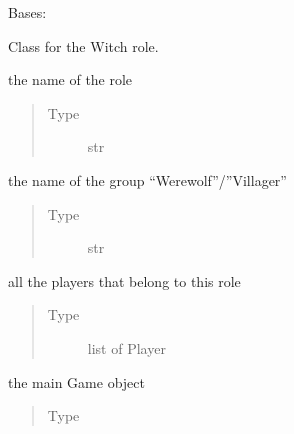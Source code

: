 \documentclass[letterpaper,10pt,english]{sphinxmanual}
\begin{document}
\begin{fulllineitems}
Bases: 

Class for the Witch role.


\begin{fulllineitems}
the name of the role
\begin{quote}\begin{description}
\item[{Type}] \leavevmode
str

\end{description}\end{quote}

\end{fulllineitems}



\begin{fulllineitems}
the name of the group “Werewolf”/”Villager”
\begin{quote}\begin{description}
\item[{Type}] \leavevmode
str

\end{description}\end{quote}

\end{fulllineitems}



\begin{fulllineitems}
all the players that belong to this role
\begin{quote}\begin{description}
\item[{Type}] \leavevmode
list of Player

\end{description}\end{quote}

\end{fulllineitems}



\begin{fulllineitems}
the main Game object
\begin{quote}\begin{description}
\item[{Type}] \leavevmode
{\hyperref[\detokenize{chatwolf:chatwolf.game.Game}]{}}


\end{description}
\end{quote}
\end{fulllineitems}
\end{fulllineitems}
\end{document}
